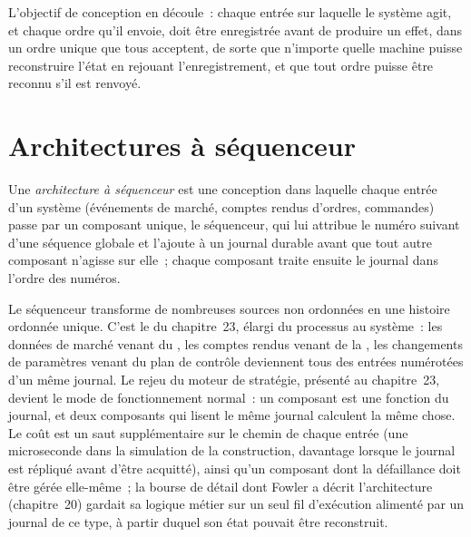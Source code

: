 L'objectif de conception en découle~: chaque entrée sur laquelle le système agit, et chaque ordre qu'il envoie, doit être enregistrée avant de produire un effet, dans
un ordre unique que tous acceptent, de sorte que n'importe quelle machine puisse reconstruire l'état en rejouant l'enregistrement, et que tout ordre puisse
être reconnu s'il est renvoyé.

\section{Architectures à séquenceur}

\begin{definition}\label{def:ll:resilience:sequencer}
Une \emph{architecture à séquenceur} est une conception dans laquelle chaque entrée d'un système (événements de marché,
comptes rendus d'ordres, commandes) passe par un composant unique, le séquenceur, qui lui attribue le numéro suivant d'une séquence globale
et l'ajoute à un journal durable avant que tout autre composant n'agisse sur elle~; chaque composant traite ensuite le
journal dans l'ordre des numéros.
\end{definition}

Le séquenceur transforme de nombreuses sources non ordonnées en une histoire ordonnée unique. C'est le  du chapitre~23, élargi du
processus au système~: les données de marché venant du , les comptes rendus venant de la , les changements de paramètres venant du
plan de contrôle deviennent tous des entrées numérotées d'un même journal. Le rejeu du moteur de stratégie, présenté au chapitre~23, devient le mode
de fonctionnement normal~: un composant est une fonction du journal, et deux composants qui lisent le même journal calculent la
même chose. Le coût est un saut supplémentaire sur le chemin de chaque entrée (une microseconde dans la simulation de la construction, davantage lorsque le
journal est répliqué avant d'être acquitté), ainsi qu'un composant dont la défaillance doit être gérée elle-même~; la bourse de détail dont Fowler a décrit
l'architecture (chapitre~20) gardait sa logique métier sur un seul fil d'exécution alimenté par un journal de ce type, à partir duquel son état pouvait être reconstruit.

